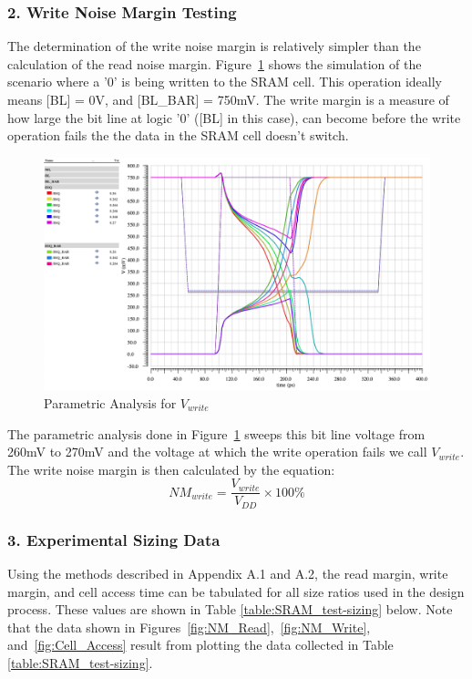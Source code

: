 \documentclass[10pt,letterpaper,onecolumn]{article}
\begin{document}
\subsubsection*{2. Write Noise Margin Testing}
The determination of the write noise margin is relatively simpler than the calculation of the read noise margin. Figure~\ref{fig:Test_Vwrite} shows the simulation of the scenario where a '0' is being written to the SRAM cell. This operation ideally means [BL] = 0V, and [BL\_BAR] = 750mV. The write margin is a measure of how large the bit line at logic '0' ([BL] in this case), can become before the write operation fails the the data in the SRAM cell doesn't switch.
\begin{figure}[htp]
\centering
\includegraphics[clip,width=\columnwidth]{Problem2-NM_Write-WAVEFORM.png}
\caption{Parametric Analysis for $V_{write}$}
\label{fig:Test_Vwrite}
\end{figure}
The parametric analysis done in Figure~\ref{fig:Test_Vwrite} sweeps this bit line voltage from 260mV to 270mV and the voltage at which the write operation fails we call $V_{write}$. The write noise margin is then calculated by the equation:
\[ 
  NM_{write} = \frac{V_{write}}{V_{DD}}\times100\%
\]
\subsubsection*{3. Experimental Sizing Data}
Using the methods described in Appendix A.1 and A.2, the read margin, write margin, and cell access time can be tabulated for all size ratios used in the design process. These values are shown in Table \ref{table:SRAM_test-sizing} below. Note that the data shown in Figures~\ref{fig:NM_Read},~\ref{fig:NM_Write}, and~\ref{fig:Cell_Access} result from plotting the data collected in Table \ref{table:SRAM_test-sizing}.
\end{document}
